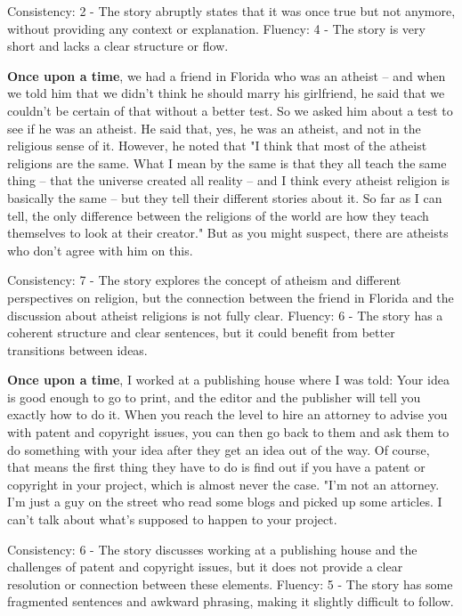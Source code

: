 \documentclass{article}
\begin{document}
Consistency: 2 - The story abruptly states that it was once true but not anymore, without providing any context or explanation.
Fluency: 4 - The story is very short and lacks a clear structure or flow.

\textbf{Once upon a time}, we had a friend in Florida who was an atheist – and when we told him that we didn't think he should marry his girlfriend, he said that we couldn't be certain of that without a better test. So we asked him about a test to see if he was an atheist. He said that, yes, he was an atheist, and not in the religious sense of it. However, he noted that "I think that most of the atheist religions are the same. What I mean by the same is that they all teach the same thing – that the universe created all reality – and I think every atheist religion is basically the same – but they tell their different stories about it. So far as I can tell, the only difference between the religions of the world are how they teach themselves to look at their creator." But as you might suspect, there are atheists who don't agree with him on this.

Consistency: 7 - The story explores the concept of atheism and different perspectives on religion, but the connection between the friend in Florida and the discussion about atheist religions is not fully clear.
Fluency: 6 - The story has a coherent structure and clear sentences, but it could benefit from better transitions between ideas.

\textbf{Once upon a time}, I worked at a publishing house where I was told: Your idea is good enough to go to print, and the editor and the publisher will tell you exactly how to do it. When you reach the level to hire an attorney to advise you with patent and copyright issues, you can then go back to them and ask them to do something with your idea after they get an idea out of the way. Of course, that means the first thing they have to do is find out if you have a patent or copyright in your project, which is almost never the case. "I'm not an attorney. I'm just a guy on the street who read some blogs and picked up some articles. I can't talk about what's supposed to happen to your project.

Consistency: 6 - The story discusses working at a publishing house and the challenges of patent and copyright issues, but it does not provide a clear resolution or connection between these elements.
Fluency: 5 - The story has some fragmented sentences and awkward phrasing, making it slightly difficult to follow.
\end{document}
